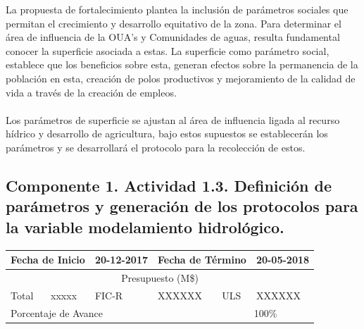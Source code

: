 \documentclass[]{article}
\begin{document}
La propuesta de fortalecimiento plantea la inclusión de parámetros sociales que permitan el crecimiento y desarrollo equitativo de la zona. Para determinar el área de influencia de la OUA's y Comunidades de aguas, resulta fundamental conocer la superficie asociada a estas. La superficie como parámetro social, establece que los beneficios sobre esta, generan efectos sobre la permanencia de la población en esta, creación de polos productivos y mejoramiento de la calidad de vida a través de la creación de empleos.\\
\\
Los parámetros de superficie se ajustan al área de influencia ligada al recurso hídrico y desarrollo de agricultura, bajo estos supuestos se establecerán los parámetros y se desarrollará el protocolo para la recolección de estos.

\subsection{Componente 1. Actividad 1.3. Definición de parámetros y generación de los protocolos para la variable modelamiento hidrológico.}

\begin{table}[!htb]
\centering
\begin{tabular}{|p{2cm}|p{2cm}|p{2cm}|p{2cm}|p{2cm}|p{2cm}|}
    \hline
    \multicolumn{2}{|l|}{Fecha de Inicio} & 20-12-2017 & \multicolumn{2}{l|}{Fecha de Término} & 20-05-2018\\
    \hline
    \multicolumn{6}{|c|}{Presupuesto (M\$)}\\
    \hline
    Total & xxxxx & FIC-R & XXXXXX & ULS & XXXXXX\\
    \hline
    \multicolumn{4}{|l|}{Porcentaje de Avance} & \multicolumn{2}{c|}{100\%}\\
    \hline
\end{tabular}
\end{table}
\end{document}
